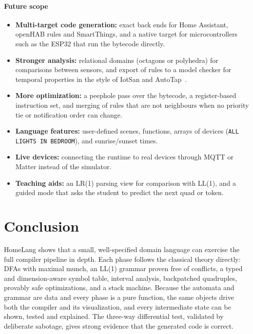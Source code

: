 \documentclass[conference]{IEEEtran}
\newcommand{\code}[1]{\texttt{#1}}
\begin{document}
\paragraph{Future scope}
\begin{itemize}
  \item \textbf{Multi-target code generation:} exact back ends for Home Assistant, openHAB rules and SmartThings, and a native target for microcontrollers such as the ESP32 that run the bytecode directly.
  \item \textbf{Stronger analysis:} relational domains (octagons or polyhedra) for comparisons between sensors, and export of rules to a model checker for temporal properties in the style of IotSan and AutoTap~\cite{iotsan,autotap}.
  \item \textbf{More optimization:} a peephole pass over the bytecode, a register-based instruction set, and merging of rules that are not neighbours when no priority tie or notification order can change.
  \item \textbf{Language features:} user-defined scenes, functions, arrays of devices (\code{ALL LIGHTS IN BEDROOM}), and sunrise/sunset times.
  \item \textbf{Live devices:} connecting the runtime to real devices through MQTT or Matter instead of the simulator.
  \item \textbf{Teaching aids:} an LR(1) parsing view for comparison with LL(1), and a guided mode that asks the student to predict the next quad or token.
\end{itemize}

\section{Conclusion}

HomeLang shows that a small, well-specified domain language can exercise the full compiler pipeline in depth. Each phase follows the classical theory directly: DFAs with maximal munch, an LL(1) grammar proven free of conflicts, a typed and dimension-aware symbol table, interval analysis, backpatched quadruples, provably safe optimizations, and a stack machine. Because the automata and grammar are data and every phase is a pure function, the same objects drive both the compiler and its visualization, and every intermediate state can be shown, tested and explained. The three-way differential test, validated by deliberate sabotage, gives strong evidence that the generated code is correct.
\end{document}
